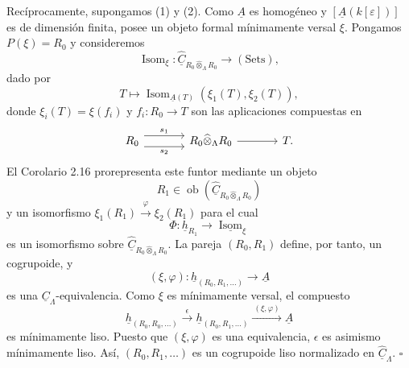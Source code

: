 Recíprocamente, supongamos (1) y (2). Como $\underline A$ es homogéneo y
$[\underline A(k[\varepsilon])]$ es de dimensión finita, posee un objeto
formal mínimamente versal $\xi$. Pongamos $P(\xi)=R_0$ y consideremos
\[
 \operatorname{Isom}_\xi:
 \widehat{\underline C}_{R_0\widehat\otimes_\Lambda R_0}
 \longrightarrow(\mathrm{Sets}),
\]
dado por
\[
 T\longmapsto
 \operatorname{Isom}_{\underline A(T)}(\xi_1(T),\xi_2(T)),
\]
donde $\xi_i(T)=\xi(f_i)$ y $f_i:R_0\longrightarrow T$ son las
aplicaciones compuestas en
\[
\begin{tikzcd}[column sep=large]
 R_0 \arrow[r,shift left=2,"s_1"]
     \arrow[r,shift right=2,"s_2"']
 & R_0\widehat\otimes_\Lambda R_0 \arrow[r] & T.
\end{tikzcd}
\]
El Corolario 2.16 prorepresenta este funtor mediante un objeto
\[
 R_1\in
 \operatorname{ob}(\widehat{\underline C}_{R_0\widehat\otimes_\Lambda R_0})
\]
y un isomorfismo
$\xi_1(R_1)\xrightarrow{\varphi}\xi_2(R_1)$ para el cual
\[
 \Phi:\underline h_{R_1}\longrightarrow
 \underline{\operatorname{Isom}}_\xi
\]
es un isomorfismo sobre
$\widehat{\underline C}_{R_0\widehat\otimes_\Lambda R_0}$. La pareja
$(R_0,R_1)$ define, por tanto, un cogrupoide, y
\[
 (\xi,\varphi):\underline h_{(R_0,R_1,\ldots)}
 \longrightarrow\underline A
\]
es una $\underline C_\Lambda$-equivalencia. Como $\xi$ es mínimamente
versal, el compuesto
\[
 \underline h_{(R_0,R_0,\ldots)}
 \xrightarrow{\ \epsilon\ }
 \underline h_{(R_0,R_1,\ldots)}
 \xrightarrow{\ (\xi,\varphi)\ }
 \underline A
\]
es mínimamente liso. Puesto que $(\xi,\varphi)$ es una equivalencia,
$\epsilon$ es asimismo mínimamente liso. Así,
$(R_0,R_1,\ldots)$ es un cogrupoide liso normalizado en
$\widehat{\underline C}_\Lambda$. \hfill$\square$
